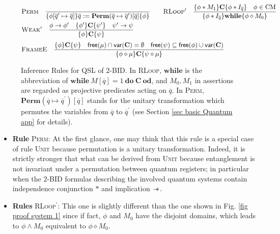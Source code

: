 \documentclass[conference,compsoc, 10pt]{IEEEtran}
\newcommand {\qbar} {{\overline{q}}}
\newcommand {\id } {{I}}
\newcommand {\V }[1] {{\mathsf{free}{\left(#1\right)}}}
\newcommand {\var } {\mathsf{var}}
\newcommand {\prog } {{\mathbf{C}}}
\newcommand {\sepimp} {\mathrel{-\mkern-6mu*}}
\newcommand{\sd}{\diamond}%
\newcommand {\perm} {\mathbf{Perm}}
\begin{document}
\begin{appendices}
		\begin{figure}\centering
			\begin{equation*}\begin{split}
			&\textsc{Perm}\quad \frac{}{\{\phi[\qbar^\prime\mapsto\qbar]\}\qbar:=\perm(\qbar\mapsto\qbar^\prime)[\qbar]\{\phi\}} \qquad
			\textsc{RLoop$^\prime$}\quad\frac{\{\phi\ast M_1\}\prog\{\phi\ast\id_{\qbar}\}\quad\phi\in\text{CM}}{\{\phi\ast\id_{\qbar}\}\mathbf{while}\{\phi\sd M_0\}} \\
			&\textsc{Weak$^\prime$}\quad  \frac{\phi\rightarrow\phi^\prime\quad \{\phi^{\prime}\}\prog\{\psi^{\prime}\}\quad 
				\psi^{\prime}\rightarrow\psi  }{\{\phi\}\prog\{\psi\}} \\[0.1cm]
			&\textsc{FrameE}\quad \frac{\{\phi\}\prog\{\psi\}\quad\V{\mu}\cap\var(\prog)=\emptyset\quad\V{\psi}\subseteq\V{\phi}\cup\var(\prog)}{\{\phi\sd\mu\}\prog\{\psi\sd\mu\}} 
			\end{split}\end{equation*}
			\caption{Inference Rules for QSL of 2-BID. In \textsc{RLoop}, $\mathbf{while}$ is the abbreviation of $\mathbf{while}\ M[\qbar]=1\ \mathbf{do}\ \prog\ \mathbf{od}$, and  $M_0,M_1$ in assertions are regarded as projective predicates acting on $\qbar$. In \textsc{Perm}, $\perm(\qbar\mapsto\qbar^\prime)[\qbar]$ stands for the unitary transformation which permutes the variables from $\qbar$ to $\qbar^\prime$ (see Section \ref{sec basic Quantum app} for details).
			}
			\label{fig proof system 4}
		\end{figure}
		
		\begin{itemize}
			
			\item\textbf{Rule} \textsc{Perm}: At the first glance, one may think that this rule is a special case of rule \textsc{Unit} because permutation is a unitary transformation. Indeed, it is strictly stronger that what can be derived from \textsc{Unit} because entanglement is not invariant under a permutation between quantum registers; in particular when the 2-BID formulas describing the involved quantum systems contain independence conjunction $\ast$ and implication $\sepimp$.
			
			\item\textbf{Rules} \textsc{RLoop$^\prime$}: This one is slightly different than the one shown in Fig. \ref{fig proof system 1} since if fact, $\phi$ and $M_0$ have the disjoint domains, which leads to $\phi\wedge M_0$ equivalent to $\phi\sd M_0$.
			

\end{itemize}
\end{appendices}
\end{document}
